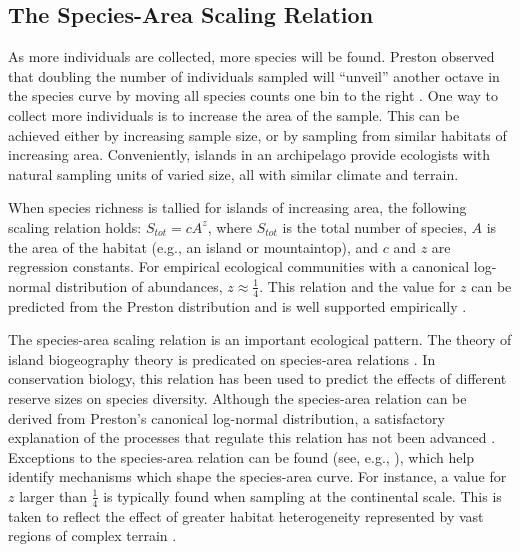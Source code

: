 \subsection{The Species-Area Scaling Relation}

As more individuals are collected, more species will be found.
Preston observed that doubling the number of individuals sampled will
``unveil'' another octave in the species curve by moving all species
counts one bin to the right \cite{Preston48,Preston62a}.  One way to
collect more individuals is to increase the area of the sample.  This
can be achieved either by increasing sample size, or by
sampling from similar habitats of increasing area.  Conveniently,
islands in an archipelago provide ecologists with natural sampling
units of varied size, all with similar climate and terrain. 

When species richness is tallied for islands of increasing area, the
following scaling relation holds:  $S_{tot} = cA^z$, where $S_{tot}$
is the total number of species, $A$ is the area of the habitat (e.g.,
an island or mountaintop), and $c$ and $z$ are regression constants.
For empirical ecological communities with a canonical log-normal
distribution of abundances, $z \approx \frac{1}{4}$.  This relation and the
value for $z$ can be predicted from the Preston distribution
\cite{Preston62a,May75,Pielou77} and is well supported empirically
\cite{Preston62a,MacArthurAndWilson67,DurrettAndLevin95}.

The species-area scaling relation is an important ecological
pattern.  The theory of island biogeography theory is predicated
on species-area relations \cite{MacArthurAndWilson67}.  In
conservation biology, this relation has been used to predict the
effects of different reserve sizes on species diversity.  Although the
species-area relation can be derived from Preston's canonical
log-normal distribution, a satisfactory explanation of the processes
that regulate this relation has not been advanced
\cite{DurrettAndLevin95}.  Exceptions to the species-area relation can be 
found (see, e.g., \cite{Preston80}), which help identify mechanisms
which shape the species-area curve.  For instance, a value for $z$
larger than $\frac{1}{4}$ is typically found when sampling at the continental
scale.  This is taken to reflect the effect of greater habitat
heterogeneity represented by vast regions of complex terrain
\cite{MacArthurAndWilson67}.


